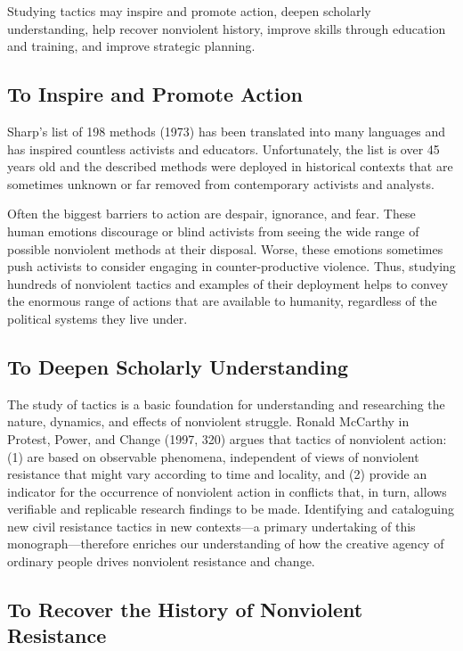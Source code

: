 \documentclass[twoside,a4paper,12pt,fleqn,openany]{extbook}
\begin{document}
Studying tactics may inspire and promote action, deepen scholarly understanding, help recover nonviolent history, improve skills through education and training, and improve strategic planning.

\subsection*{To Inspire and Promote Action}

Sharp’s list of 198 methods (1973) has been translated into many languages and has inspired countless activists and educators.
Unfortunately, the list is over 45 years old and the described methods were deployed in historical contexts that are sometimes unknown or far removed from contemporary activists and analysts.

Often the biggest barriers to action are despair, ignorance, and fear.
These human emotions discourage or blind activists from seeing the wide range of possible nonviolent methods at their disposal.
Worse, these emotions sometimes push activists to consider engaging in counter-productive violence.
Thus, studying hundreds of nonviolent tactics and examples of their deployment helps to convey the enormous range of actions that are available to humanity, regardless of the political systems they live under.

\subsection*{To Deepen Scholarly Understanding}

The study of tactics is a basic foundation for understanding and researching the nature, dynamics, and effects of nonviolent struggle.
Ronald McCarthy in Protest, Power, and Change (1997, 320) argues that tactics of nonviolent action: (1) are based on observable phenomena, independent of views of nonviolent resistance that might vary according to time and locality, and (2) provide an indicator for the occurrence of nonviolent action in conflicts that, in turn, allows verifiable and replicable research findings to be made.
Identifying and cataloguing new civil resistance tactics in new contexts—a primary undertaking of this monograph—therefore enriches our understanding of how the creative agency of ordinary people drives nonviolent resistance and change.

\subsection*{To Recover the History of Nonviolent Resistance}
\end{document}
